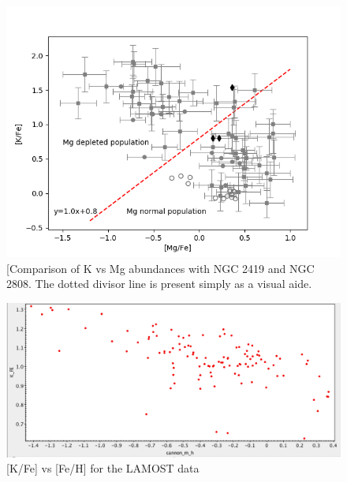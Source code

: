 \documentclass[a4paper,fleqn,usenatbib]{mnras}
\begin{document}
\begin{figure}
	\includegraphics[width=\columnwidth]{KvsMgab.png}
    \caption{[Comparison of K vs Mg abundances with NGC 2419 and NGC 2808. The dotted divisor line is present simply as a visual aide.}
    \label{KvsMg}
\end{figure}

\begin{figure}
	\includegraphics[width=\columnwidth]{KvsFe.png}
    \caption{[K/Fe] vs [Fe/H] for the LAMOST data}
    \label{KvsFe}
\end{figure}
\end{document}
